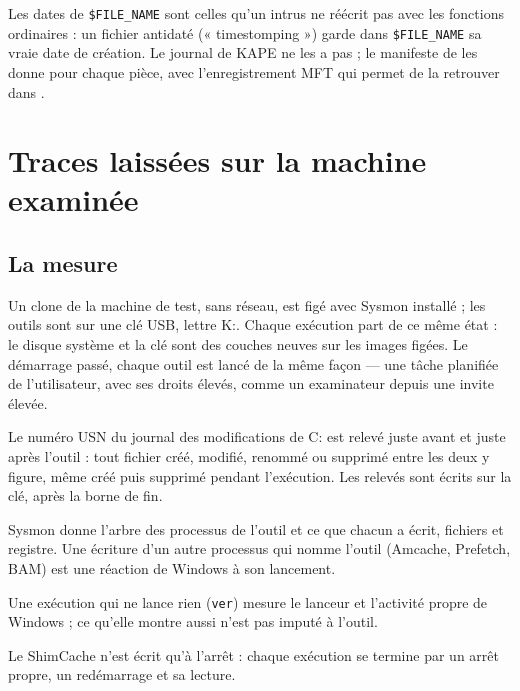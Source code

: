 \documentclass[11pt,a4paper,oneside]{report}
\begin{document}
\begin{note}
Les dates de \texttt{\$FILE\_NAME} sont celles qu'un intrus ne réécrit pas
avec les fonctions ordinaires : un fichier antidaté (« timestomping ») garde
dans \texttt{\$FILE\_NAME} sa vraie date de création. Le journal de KAPE ne les
a pas ; le manifeste de \wac{} les donne pour chaque pièce, avec l'enregistrement
MFT qui permet de la retrouver dans .
\end{note}

\chapter{Traces laissées sur la machine examinée}\label{chap:traces}

\section{La mesure}

Un clone de la machine de test, sans réseau, est figé avec Sysmon installé ; les
outils sont sur une clé USB, lettre K:. Chaque exécution part de ce même état :
le disque système et la clé sont des couches neuves sur les images figées. Le
démarrage passé, chaque outil est lancé de la même façon --- une tâche planifiée
de l'utilisateur, avec ses droits élevés, comme un examinateur depuis une invite
élevée.

\begin{description}[style=nextline,leftmargin=1em]
  \item[Les fichiers] Le numéro USN du journal des modifications de C: est relevé
        juste avant et juste après l'outil : tout fichier créé, modifié, renommé
        ou supprimé entre les deux y figure, même créé puis supprimé pendant
        l'exécution. Les relevés sont écrits sur la clé, après la borne de fin.
  \item[L'auteur] Sysmon donne l'arbre des processus de l'outil et ce que chacun
        a écrit, fichiers et registre. Une écriture d'un autre processus qui
        nomme l'outil (Amcache, Prefetch, BAM) est une réaction de Windows à son
        lancement.
  \item[Le témoin] Une exécution qui ne lance rien (\texttt{ver}) mesure le
        lanceur et l'activité propre de Windows ; ce qu'elle montre aussi n'est
        pas imputé à l'outil.
  \item[Le différé] Le ShimCache n'est écrit qu'à l'arrêt : chaque exécution se
        termine par un arrêt propre, un redémarrage et sa lecture.
\end{description}
\end{document}
